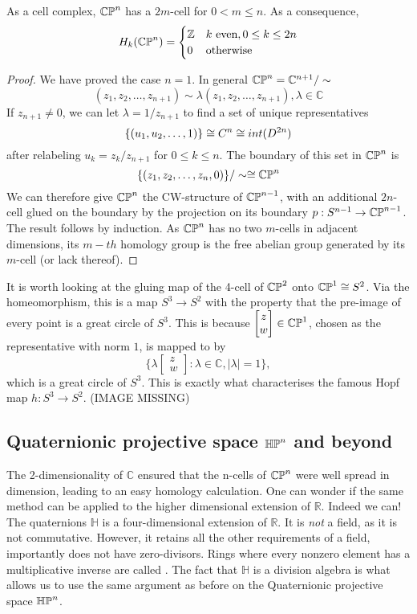 \begin{prop}
As a cell complex, $\mathbb{CP}^{n}$ has a $2m$-cell for $0<m\leq n$. As a consequence,
$$H_k(\mathbb{CP}^{n})=\begin{cases} 
      \mathbb{Z} & k \text{ even}, 0\leq k \leq 2n \\
      0 & \text{otherwise}
   \end{cases}
$$
\end{prop}
\begin{proof}
We have proved the case $n=1$. In general $\mathbb{CP}^{n}=\mathbb{C}^{n+1}/\sim$
$$(z_1,z_2,\dots,z_{n+1})\sim \lambda (z_1,z_2,\dots,z_{n+1}), \lambda \in \mathbb{C}$$ If $z_{n+1}\neq 0$, we can let $\lambda=1/z_{n+1}$ to find a set of unique representatives
$$\{(u_1,u_2,\dots,1)\}\cong C^{n}\cong int(D^{2n})$$
after relabeling $u_k=z_k/z_{n+1}$ for $0\leq k \leq n$.
The boundary of this set in $\mathbb{CP}^{n}$ is $$\{(z_1,z_2,\dots,z_n,0)\}/\sim \cong \mathbb{CP}^{n}$$ We can therefore give $\mathbb{CP}^{n}$ the CW-structure of $\mathbb{CP}^{n-1}$, with an additional $2n$-cell glued on the boundary by the projection on its boundary $p:S^{n-1}\rightarrow \mathbb{CP}^{n-1}$. The result follows by induction. As $\mathbb{CP}^{n}$ has no two $m$-cells in adjacent dimensions, its $m-th$ homology group is the free abelian group generated by its $m$-cell (or lack thereof).
\end{proof}

\begin{remark}\label{hopf}
It is worth looking at the gluing map of the 4-cell of $\mathbb{CP}^{2}$ onto $\mathbb{CP}^{1}\cong S^{2}$. Via the homeomorphism, this is a map $S^{3}\rightarrow S^{2}$ with the property that the pre-image of every point is a great circle of $S^3$. This is because $\begin{bmatrix}z\\w \end{bmatrix}\in \mathbb{CP}^{1}$, chosen as the representative with norm $1$, is mapped to by $$\{\lambda \begin{bmatrix}z\\w \end{bmatrix} : \lambda\in \mathbb{C},|\lambda|=1\},$$ which is a great circle of $S^{3}$. This is exactly what characterises the famous Hopf map $h:S^3\rightarrow S^2$. (IMAGE MISSING)
\end{remark}


\subsection{Quaternionic projective space $\mathbb{HP}^{n}$ and beyond}
The 2-dimensionality of $\mathbb{C}$ ensured that the n-cells of $\mathbb{CP}^{n}$ were well spread in dimension, leading to an easy homology calculation. One can wonder if the same method can be applied to the higher dimensional extension of $\mathbb{R}$. Indeed we can! The quaternions $\mathbb{H}$ is a four-dimensional extension of $\mathbb{R}$. It is \textit{not} a field, as it is not commutative. However, it retains all the other requirements of a field, importantly does not have zero-divisors. Rings where every nonzero element has a multiplicative inverse are called . The fact that $\mathbb{H}$ is a division algebra is what allows us to use the same argument as before on the Quaternionic projective space $\mathbb{HP}^{n}$.

